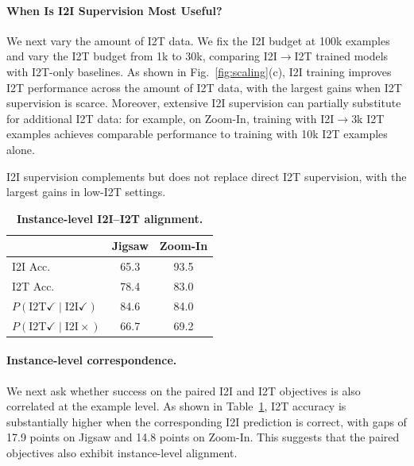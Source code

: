 \paragraph{When Is I2I Supervision Most Useful?}
We next vary the amount of I2T data.
We fix the I2I budget at 100k examples and vary the I2T budget from 1k to 30k, comparing I2I$\rightarrow$I2T trained models with I2T-only baselines.
As shown in Fig.~\ref{fig:scaling}(c), I2I training improves I2T performance across the amount of I2T data, with the largest gains when I2T supervision is scarce.
Moreover, extensive I2I supervision can partially substitute for additional I2T data: for example, on Zoom-In, training with I2I$\rightarrow$3k I2T examples achieves comparable performance to training with 10k I2T examples alone.
\begin{findingbox}
I2I supervision complements but does not replace direct I2T supervision,
with the largest gains in low-I2T settings.
\end{findingbox}
\begingroup
\begin{table}
    \vspace{-\intextsep}
    \centering
    \small
    \setlength{\tabcolsep}{3pt}
    \makeatletter
    \long{}
    \makeatother
    \caption{\textbf{Instance-level I2I--I2T alignment.}}   \label{tab:controlled_instance_alignment}
    \begin{tabular}{@{}lcc@{}}
        \toprule
        & Jigsaw & Zoom-In \\
        \midrule
        I2I Acc. & 65.3 & 93.5 \\
        I2T Acc. & 78.4 & 83.0 \\
        $P(\mathrm{I2T}\checkmark\mid\mathrm{I2I}\checkmark)$ & 84.6 & 84.0 \\
        $P(\mathrm{I2T}\checkmark\mid\mathrm{I2I}\times)$ & 66.7 & 69.2 \\
        \bottomrule
    \end{tabular}
\end{table}
\raggedright
\paragraph{Instance-level correspondence.}
We next ask whether success on the paired I2I and I2T objectives is also correlated at the example level.
As shown in Table~\ref{tab:controlled_instance_alignment}, I2T accuracy is substantially higher when the corresponding I2I prediction is correct, with gaps of 17.9 points on Jigsaw and 14.8 points on Zoom-In.
This suggests that the paired objectives also exhibit instance-level alignment.
\par\WFclear
\endgroup
